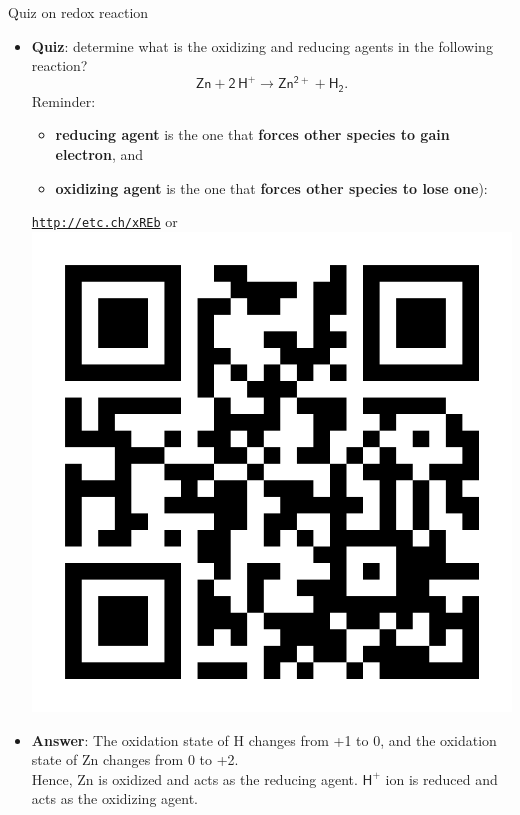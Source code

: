 %		
%	
%
%
\begin{frame}{Quiz on redox reaction}
	\begin{itemize}
		\item \alert{\textbf{Quiz}}: determine what is the oxidizing and reducing agents in the following reaction?
		\[
		\mathsf{Zn + 2\, H^+ \rightarrow  Zn^{2+} + H_2}.
		\]
		Reminder: 
			\begin{itemize}
				\item \textbf{reducing agent} is the one that \textbf{forces other species to gain electron}, and 
				\item \textbf{oxidizing agent}  is the one that \textbf{forces other species to lose one}):
			\end{itemize}
		
		\begin{center}
			\href{http://etc.ch/xREb}{\textcolor{indigo(dye)}{\tt http://etc.ch/xREb}} \quad or \quad
			\includegraphics[height=0.15\columnwidth]{figures/chemical-kinetics/polls.png}
		\end{center}
		\hiddenpause
		\item {\textbf{Answer}}: The oxidation state of H changes from +1 to 0, and the oxidation state of  Zn  changes from 0 to +2. \\
		Hence,  Zn  is oxidized and acts as the reducing agent.  $\mathsf{H^+}$  ion is reduced and acts as the oxidizing agent.
		
	\end{itemize}
	
\end{frame}

